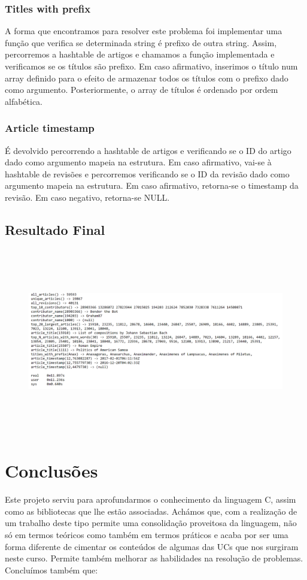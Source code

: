 \documentclass[a4paper]{article}
\begin{document}
\subsubsection{Titles with prefix}
A forma que encontramos para resolver este problema foi implementar uma função que verifica se determinada string é prefixo de outra string. Assim, percorremos a hashtable de artigos e chamamos a função implementada e verificamos se os títulos são prefixo. Em caso afirmativo, inserimos o título num array definido para o efeito de armazenar todos os títulos com o prefixo dado como argumento. Posteriormente, o array de títulos é ordenado por ordem alfabética.

\subsubsection{Article timestamp}
É devolvido percorrendo a hashtable de artigos e verificando se o ID do artigo dado como argumento mapeia na estrutura. Em caso afirmativo, vai-se à hashtable de revisões e percorremos verificando se o ID da revisão dado como argumento mapeia na estrutura. Em caso afirmativo, retorna-se o timestamp da revisão. Em caso negativo, retorna-se NULL.

\subsection{Resultado Final}

\begin{figure}[htbp]
    \centering
    \includegraphics[width = 420pt, height = 230pt]{output}
\end{figure}

\section{Conclusões}
\label{sec:conclusao}
Este projeto serviu para aprofundarmos o conhecimento da linguagem C, assim como as bibliotecas que lhe estão associadas. Achámos que, com a realização de um trabalho deste tipo permite uma consolidação proveitosa da linguagem, não só em termos teóricos como também em termos práticos e acaba por ser uma forma diferente de cimentar os conteúdos de algumas das UCs que nos surgiram neste curso. Permite também melhorar as habilidades na resolução de problemas. Concluímos também que:
\end{document}
